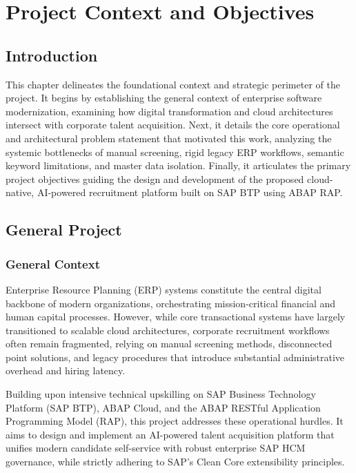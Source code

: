 \chapter{Project Context and Objectives}
\label{chap:project_context_objectives}

\section*{Introduction}

This chapter delineates the foundational context and strategic perimeter of the project. It begins by establishing the general context of enterprise software modernization, examining how digital transformation and cloud architectures intersect with corporate talent acquisition. Next, it details the core operational and architectural problem statement that motivated this work, analyzing the systemic bottlenecks of manual screening, rigid legacy ERP workflows, semantic keyword limitations, and master data isolation. Finally, it articulates the primary project objectives guiding the design and development of the proposed cloud-native, AI-powered recruitment platform built on SAP BTP using ABAP RAP.

\newpage

\section{General Project}
\label{sec:general_project}

\subsection{General Context}
\label{subsec:general_context}

Enterprise Resource Planning (ERP) systems constitute the central digital backbone of modern organizations, orchestrating mission-critical financial and human capital processes. However, while core transactional systems have largely transitioned to scalable cloud architectures, corporate recruitment workflows often remain fragmented, relying on manual screening methods, disconnected point solutions, and legacy procedures that introduce substantial administrative overhead and hiring latency.

Building upon intensive technical upskilling on SAP Business Technology Platform (SAP BTP), ABAP Cloud, and the ABAP RESTful Application Programming Model (RAP), this project addresses these operational hurdles. It aims to design and implement an AI-powered talent acquisition platform that unifies modern candidate self-service with robust enterprise SAP HCM governance, while strictly adhering to SAP's Clean Core extensibility principles.

